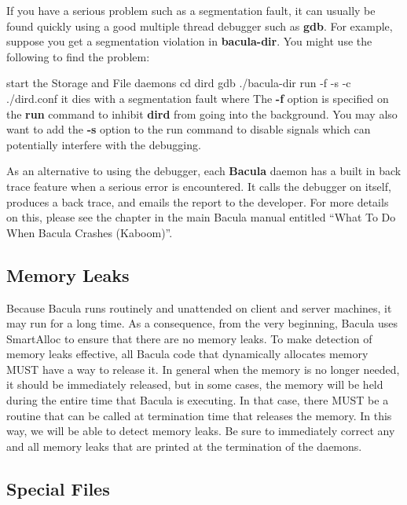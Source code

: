 If you have a serious problem such as a segmentation fault, it can usually be
found quickly using a good multiple thread debugger such as {\bf gdb}. For
example, suppose you get a segmentation violation in {\bf bacula-dir}. You
might use the following to find the problem: 

\lt{}start the Storage and File daemons\gt{}
cd dird
gdb ./bacula-dir
run -f -s -c ./dird.conf
\lt{}it dies with a segmentation fault\gt{}
where
The {\bf -f} option is specified on the {\bf run} command to inhibit {\bf
dird} from going into the background. You may also want to add the {\bf -s}
option to the run command to disable signals which can potentially interfere
with the debugging. 

As an alternative to using the debugger, each {\bf Bacula} daemon has a built
in back trace feature when a serious error is encountered. It calls the
debugger on itself, produces a back trace, and emails the report to the
developer. For more details on this, please see the chapter in the main Bacula
manual entitled ``What To Do When Bacula Crashes (Kaboom)''. 

\subsection{Memory Leaks}

Because Bacula runs routinely and unattended on client and server machines, it
may run for a long time. As a consequence, from the very beginning, Bacula
uses SmartAlloc to ensure that there are no memory leaks. To make detection of
memory leaks effective, all Bacula code that dynamically allocates memory MUST
have a way to release it. In general when the memory is no longer needed, it
should be immediately released, but in some cases, the memory will be held
during the entire time that Bacula is executing. In that case, there MUST be a
routine that can be called at termination time that releases the memory. In
this way, we will be able to detect memory leaks. Be sure to immediately
correct any and all memory leaks that are printed at the termination of the
daemons. 

\subsection{Special Files}

